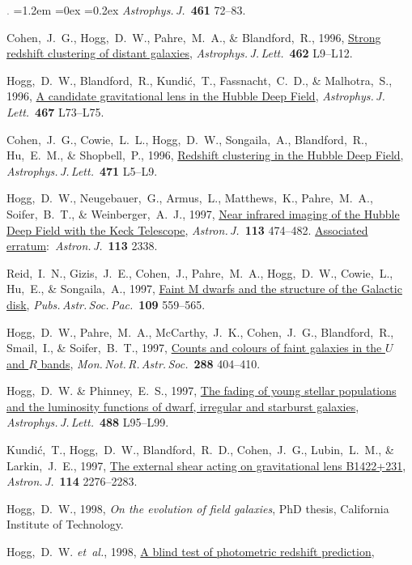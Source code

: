 \documentclass[10pt,letterpaper]{article}
\newcommand{\foreign}[1]{\textsl{#1}}
\newcommand{\etal}{\foreign{et~al.}}
\newcommand{\doi}[2]{\href{http://dx.doi.org/#1}{{#2}}}
\newcommand{\ads}[2]{\href{http://adsabs.harvard.edu/abs/#1}{{#2}}}
\newcommand{\deemph}[1]{\textcolor{grey}{\footnotesize{#1}}}
\newcommand{\pubnumber}[1]{\deemph{{#1}.}}
\newcounter{refpubnum}
\newcommand{\hogglist}{%
    \rightmargin=0in
    \leftmargin=1.2em
    \topsep=0ex
    \partopsep=0pt
    \itemsep=0.2ex
    \parsep=0pt
    \itemindent=-1.0\leftmargin
    \listparindent=0.0\leftmargin
    \settowidth{\labelsep}{~}
    \usecounter{refpubnum}
  }
\begin{document}
\begin{list}{\pubnumber{\therefpubnum}}{\hogglist}
\textit{Astrophys.\,J.}\ \textbf{461} 72--83.
\item
Cohen,~J.~G., Hogg,~D.~W., Pahre,~M.~A., \& Blandford,~R., 1996,
\doi{10.1086/310020}{Strong redshift clustering of distant galaxies},
\textit{Astrophys.\,J.\,Lett.}\ \textbf{462} L9--L12.
\item
Hogg,~D.~W., Blandford,~R., Kundi\'c,~T., Fassnacht,~C.~D., \& Malhotra,~S., 1996,
\doi{10.1086/310213}{A candidate gravitational lens in the Hubble Deep Field},
\textit{Astrophys.\,J.\,Lett.}\ \textbf{467} L73--L75.
\item
Cohen,~J.~G., Cowie,~L.~L., Hogg,~D.~W., Songaila,~A., Blandford,~R.,
Hu,~E.~M., \& Shopbell,~P., 1996,
\doi{10.1086/310330}{Redshift clustering in the Hubble Deep Field},
\textit{Astrophys.\,J.\,Lett.}\ \textbf{471} L5--L9.
\item
Hogg,~D.~W., Neugebauer,~G., Armus,~L., Matthews,~K., Pahre,~M.~A., Soifer,~B.~T.,
\& Weinberger,~A.~J., 1997,
\doi{10.1086/118269}{Near infrared imaging of the Hubble Deep Field with the Keck Telescope},
\textit{Astron.\,J.}\ \textbf{113} 474--482.
\doi{10.1086/118445}{Associated erratum}:\ \textit{Astron.\,J.}\ \textbf{113} 2338.
\item
Reid,~I.~N., Gizis,~J.~E., Cohen,~J., Pahre,~M.~A., Hogg,~D.~W., Cowie,~L., Hu,~E., \& Songaila,~A., 1997,
\ads{1997PASP..109..559R}{Faint M dwarfs and the structure of the Galactic disk},
\textit{Pubs.\,Astr.\,Soc.\,Pac.}\ \textbf{109} 559--565.
\item
Hogg,~D.~W., Pahre,~M.~A., McCarthy,~J.~K., Cohen,~J.~G., Blandford,~R., Smail,~I., \& Soifer,~B.~T., 1997,
\ads{1997MNRAS.288..404H}{Counts and colours of faint galaxies in the $U$ and $R$ bands},
\textit{Mon.\,Not.\,R.\,Astr.\,Soc.}\ \textbf{288} 404--410.
\item
Hogg,~D.~W. \& Phinney,~E.~S., 1997,
\doi{10.1086/310929}{The fading of young stellar populations and the luminosity functions of dwarf, irregular and starburst galaxies},
\textit{Astrophys.\,J.\,Lett.}\ \textbf{488} L95--L99.
\item
Kundi\'c,~T., Hogg,~D.~W., Blandford,~R.~D., Cohen,~J.~G., Lubin,~L.~M., \& Larkin,~J.~E., 1997,
\doi{10.1086/118647}{The external shear acting on gravitational lens B1422+231},
\textit{Astron.\,J.}\ \textbf{114} 2276--2283.
\item
Hogg,~D.~W., 1998,
{\textit{On the evolution of field galaxies},}
PhD thesis, California Institute of Technology.
\item
Hogg,~D.~W. \etal, 1998,
\doi{10.1086/300277}{A blind test of photometric redshift prediction},

\end{list}
\end{document}
